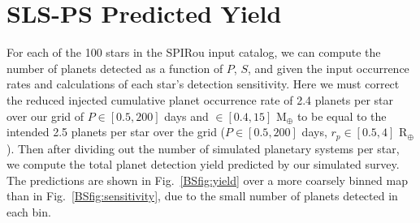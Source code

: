\section{SLS-PS Predicted Yield} \label{BSsect:yield}
For each of the 100 stars in the SPIRou input catalog,
we can compute the number of planets detected as a function of $P$, $S$,
and \msini{} given the input occurrence rates and calculations of each star's detection sensitivity.
Here we must correct the reduced injected cumulative planet occurrence rate of 2.4 planets per star
over our grid of $P \in [0.5,200]$ days and \msini{} $\in [0.4,15]$ M$_{\oplus}$ to be equal to the
intended 2.5 planets per star over the \cite{dressing15a} grid ($P \in [0.5,200]$ days, $r_p \in [0.5,4]$
R$_{\oplus}$). Then after dividing out the number of simulated planetary systems per star,
we compute the total planet detection yield predicted by our
simulated survey. The predictions are shown in Fig.~\ref{BSfig:yield} over a more coarsely
binned map than in Fig.~\ref{BSfig:sensitivity}, due to the small number of planets detected in each
bin.

